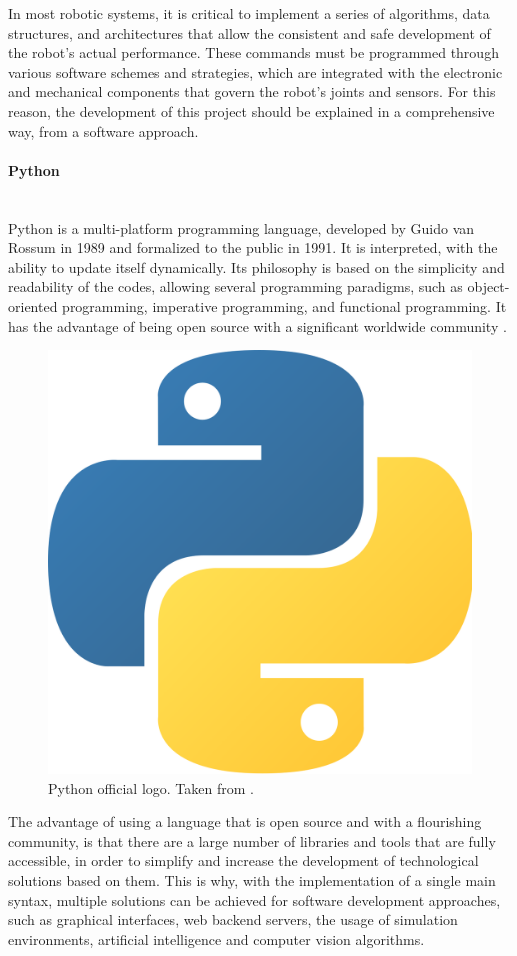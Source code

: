 \documentclass[11pt]{report} %
\newcommand{\subsubsubsection}[1]{\paragraph{#1}\mbox{}\\}
\begin{document}
In most robotic systems, it is critical to implement a series of algorithms, data structures, and architectures that allow the consistent and safe development of the robot's actual performance. These commands must be programmed through various software schemes and strategies, which are integrated with the electronic and mechanical components that govern the robot's joints and sensors. For this reason, the development of this project should be explained in a comprehensive way, from a software approach.\\

\subsubsubsection{Python}

Python is a multi-platform programming language, developed by Guido van Rossum in 1989 and formalized to the public in 1991. It is interpreted, with the ability to update itself dynamically. Its philosophy is based on the simplicity and readability of the codes, allowing several programming paradigms, such as object-oriented programming, imperative programming, and functional programming. It has the advantage of being open source with a significant worldwide community \citep{cite_python_official_site}.\\

\begin{figure}[H]
    \centering
    \includegraphics[width=0.3\linewidth]{assets/imgs/reference_framework/python_logo_main.png}
    \caption{Python official logo. Taken from \citep{cite_python_official_site}.} 
    \label{fig_python_main_logo}
\end{figure}

The advantage of using a language that is open source and with a flourishing community, is that there are a large number of libraries and tools that are fully accessible, in order to simplify and increase the development of technological solutions based on them. This is why, with the implementation of a single main syntax, multiple solutions can be achieved for software development approaches, such as graphical interfaces, web backend servers, the usage of simulation environments, artificial intelligence and computer vision algorithms.\\
\end{document}
